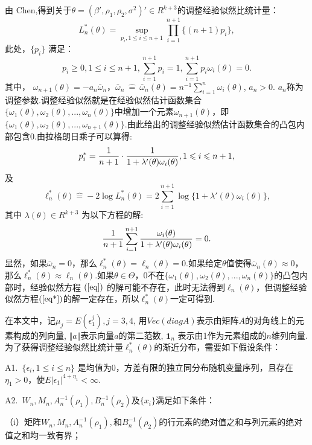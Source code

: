 \documentclass[a4paper,c5size,onecolumn,twoside,cap,Chinese]{APSart}
\begin{document}
由 Chen,得到关于$\theta=(\beta', \rho_1,\rho_2,\sigma^2)'\in R^{k+3}$的调整经验似然比统计量：
\begin{equation}
L_n^*(\theta)=\sup_{p_i, 1\leq i\leq n+1} \prod^{n+1}_{i=1}\{(n+1)p_i\} , \label{Ln*} 
\end{equation}
此处，$\{p_i\}$ 满足：
$$p_i\geq 0, 1\leq i\leq n+1,  \sum^{n+1}_{i=1}p_i =1,  \sum^{n+1}_{i=1}p_i \omega_i(\theta)=0.$$
其中，
$\omega_{n+1}(\theta)=-a_n\bar{\omega}_{n}$，$\bar{\omega}_{n} \ \hat{=} \ \bar{\omega}_{n}(\theta)= n^{-1} \sum^n_{i=1}\omega_i(\theta)$, $a_n>0$. $a_n$称为调整参数.调整经验似然就是在经验似然估计函数集合$\{\omega_{1}(\theta),\omega_{2}(\theta),...,\omega_{n}(\theta)\}$中增加一个元素$\omega_{n+1}(\theta)$，即$\{\omega_{1}(\theta),\omega_{2}(\theta),...,\omega_{n+1}(\theta)\}$.由此给出的调整经验似然估计函数集合的凸包内部包含0.由拉格朗日乘子可以算得:
$$ p_i ^*={ 1\over n+1}\cdot{1 \over 1+\lambda'(\theta)\omega_i(\theta)},1\leq i\leq n+1,$$
及
\begin{equation}
\ell^*_n(\theta)\hat{=} -2\log L_n^*(\theta)=2\sum^{n+1}_{i=1}\log \{1+\lambda'(\theta)\omega_i(\theta)\},   \label{ln*} 
\end{equation}
其中 $\lambda(\theta)\in R^{k+3}$ 为以下方程的解:
\begin{equation}
	{1\over n+1}\sum^{n+1}_{i=1}{\omega_i(\theta)\over 1+\lambda'(\theta)\omega_i(\theta)}=0.   \label{eq*} 
\end{equation}
显然，如果$\bar{\omega}_{n}=0$，那么$\ell^*_n(\theta)=\ell_n(\theta)=0$.如果给定$\theta$值使得$\bar{\omega}_{n}(\theta)\approx 0$，那么$\ell^*_n(\theta)\approx\ell_n(\theta)$.如果$\theta \in\Theta$，0不在$\{\omega_{1}(\theta),\omega_{2}(\theta),...,\omega_{n}(\theta)\}$的凸包内部时，经验似然方程 $(\ref{eq})$ 的解可能不存在，此时无法得到$\ell_n(\theta)$，但调整经验似然方程$(\ref{eq*})$的解一定存在，所以$\ell^*_n(\theta)$一定可得到.

在本文中，记$\mu_j=E(\epsilon_1^j),j=3,4$, 用$Vec(diag⁡A )$表示由矩阵$A$的对角线上的元素构成的列向量, $\Vert a \Vert$表示向量$a$的第二范数, $\bm{1}_n$ 表示由1作为元素组成的$n$维列向量.为了获得调整经验似然比统计量$\ell^*_n(\theta)$的渐近分布，需要如下假设条件：

A1.\  $\{\epsilon_{i}, 1\leq i\leq n\}$ 是均值为0，方差有限的独立同分布随机变量序列，且存在$\eta_1 > 0$，使$E|\epsilon_{1}|^{4+\eta_1 }<\infty$.

A2.\ $W_n,M_n,A_n^{-1} (\rho_1 ),B_n^{-1} (\rho_2 )$及$\{x_i \}$满足如下条件：

（i）矩阵$W_n,M_n,A_n^{-1} (\rho_1 ),$和$B_n^{-1} (\rho_2 )$的行元素的绝对值之和与列元素的绝对值之和均一致有界；
\end{document}
